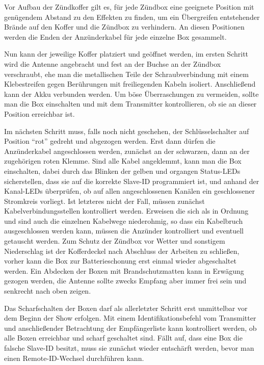 \documentclass[pdftex, parskip, numbers=noenddot, toc=listof]{scrbook}
\begin{document}
			Vor Aufbau der Zündkoffer gilt es, für jede Zündbox eine geeignete Position mit genügendem Abstand zu den Effekten zu finden, um ein Übergreifen entstehender Brände auf den Koffer und die Zündbox zu verhindern. An diesen Positionen werden die Enden der Anzünderkabel für jede einzelne Box gesammelt.

			Nun kann der jeweilige Koffer platziert und geöffnet werden, im ersten Schritt wird die Antenne angebracht und fest an der Buchse an der Zündbox verschraubt, ehe man die metallischen Teile der Schraubverbindung mit einem Klebestreifen gegen Berührungen mit freiliegenden Kabeln isoliert. Anschließend kann der Akku verbunden werden. Um böse Überraschungen zu vermeiden, sollte man die Box einschalten und mit dem Transmitter kontrollieren, ob sie an dieser Position erreichbar ist.

			Im nächsten Schritt muss, falls noch nicht geschehen, der Schlüsselschalter auf Position \enquote{rot} gedreht und abgezogen werden. Erst dann dürfen die Anzünderkabel angeschlossen werden, zunächst an der schwarzen, dann an der zugehörigen roten Klemme. Sind alle Kabel angeklemmt, kann man die Box einschalten, dabei durch das Blinken der gelben und organgen Status-LEDs sicherstellen, dass sie auf die korrekte Slave-ID programmiert ist, und anhand der Kanal-LEDs überprüfen, ob auf allen angeschlossenen Kanälen ein geschlossener Stromkreis vorliegt. Ist letzteres nicht der Fall, müssen zunächst Kabelverbindungsstellen kontrolliert werden. Erweisen die sich als in Ordnung und sind auch die einzelnen Kabelwege niederohmig, so dass ein Kabelbruch ausgeschlossen werden kann, müssen die Anzünder kontrolliert und eventuell getauscht werden. Zum Schutz der Zündbox vor Wetter und sonstigem Niederschlag ist der Kofferdeckel nach Abschluss der Arbeiten zu schließen, vorher kann die Box zur Batterieschonung erst einmal wieder abgeschaltet werden. Ein Abdecken der Boxen mit Brandschutzmatten kann in Erwägung gezogen werden, die Antenne sollte zwecks Empfang aber immer frei sein und senkrecht nach oben zeigen.

			Das Scharfschalten der Boxen darf als allerletzter Schritt erst unmittelbar vor dem Beginn der Show erfolgen. Mit einem Identifikationsbefehl vom Transmitter und anschließender Betrachtung der Empfängerliste kann kontrolliert werden, ob alle Boxen erreichbar und scharf geschaltet sind. Fällt auf, dass eine Box die falsche Slave-ID besitzt, muss sie zunächst wieder entschärft werden, bevor man einen Remote-ID-Wechsel durchführen kann.
\end{document}
